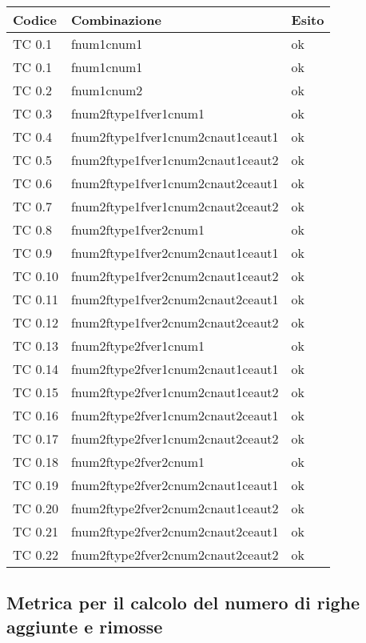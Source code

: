 \begin{tabular}{|p{3cm}|p{7cm}|p{3cm}|}
	\hline
	\rowcolor{Gray}
	\textbf{Codice} & \textbf{Combinazione} & \textbf{Esito}\tabularnewline
	\hline
	TC 0.1			& fnum1cnum1				& ok \tabularnewline
	\hline
	TC 0.1			& fnum1cnum1				& ok \tabularnewline
	\hline
	TC 0.2			& fnum1cnum2				& ok \tabularnewline
	\hline
	TC 0.3			& fnum2ftype1fver1cnum1			& ok \tabularnewline
	\hline
	TC 0.4			& fnum2ftype1fver1cnum2cnaut1ceaut1	& ok \tabularnewline
	\hline
	TC 0.5			& fnum2ftype1fver1cnum2cnaut1ceaut2	& ok \tabularnewline
	\hline
	TC 0.6			& fnum2ftype1fver1cnum2cnaut2ceaut1	& ok \tabularnewline
	\hline
	TC 0.7			& fnum2ftype1fver1cnum2cnaut2ceaut2	& ok \tabularnewline
	\hline
	TC 0.8			& fnum2ftype1fver2cnum1			& ok \tabularnewline
	\hline
	TC 0.9			& fnum2ftype1fver2cnum2cnaut1ceaut1	& ok \tabularnewline
	\hline
	TC 0.10			& fnum2ftype1fver2cnum2cnaut1ceaut2	& ok \tabularnewline
	\hline
	TC 0.11			& fnum2ftype1fver2cnum2cnaut2ceaut1	& ok \tabularnewline
	\hline
	TC 0.12			& fnum2ftype1fver2cnum2cnaut2ceaut2	& ok \tabularnewline
	\hline
	TC 0.13			& fnum2ftype2fver1cnum1			& ok \tabularnewline
	\hline
	TC 0.14			& fnum2ftype2fver1cnum2cnaut1ceaut1	& ok \tabularnewline
	\hline
	TC 0.15			& fnum2ftype2fver1cnum2cnaut1ceaut2	& ok \tabularnewline
	\hline
	TC 0.16			& fnum2ftype2fver1cnum2cnaut2ceaut1	& ok \tabularnewline
	\hline
	TC 0.17			& fnum2ftype2fver1cnum2cnaut2ceaut2	& ok \tabularnewline
	\hline
	TC 0.18			& fnum2ftype2fver2cnum1			& ok \tabularnewline
	\hline
	TC 0.19			& fnum2ftype2fver2cnum2cnaut1ceaut1	& ok \tabularnewline
	\hline
	TC 0.20			& fnum2ftype2fver2cnum2cnaut1ceaut2	& ok \tabularnewline
	\hline
	TC 0.21			& fnum2ftype2fver2cnum2cnaut2ceaut1	& ok \tabularnewline
	\hline
	TC 0.22			& fnum2ftype2fver2cnum2cnaut2ceaut2	& ok \tabularnewline
	\hline
\end{tabular}
\clearpage




\subsection{Metrica per il calcolo del numero di righe aggiunte e rimosse}

